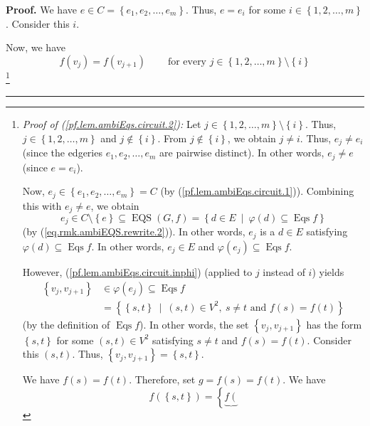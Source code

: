 \documentclass[numbers=enddot,12pt,final,onecolumn,notitlepage]{scrartcl}%
\theoremstyle{definition}
\newenvironment{proof}[1][Proof]{\noindent\textbf{#1.} }{\ \rule{0.5em}{0.5em}}
\newenvironment{verlong}{}{}
\begin{document}
\begin{verlong}
\begin{proof}
We have $e\in C=\left\{  e_{1},e_{2},\ldots,e_{m}\right\}  $. Thus, $e=e_{i}$
for some $i\in\left\{  1,2,\ldots,m\right\}  $. Consider this $i$.

Now, we have%
\begin{equation}
f\left(  v_{j}\right)  =f\left(  v_{j+1}\right)  \ \ \ \ \ \ \ \ \ \ \text{for
every }j\in\left\{  1,2,\ldots,m\right\}  \setminus\left\{  i\right\}
\label{pf.lem.ambiEqs.circuit.2}%
\end{equation}
\footnote{\textit{Proof of (\ref{pf.lem.ambiEqs.circuit.2}):} Let
$j\in\left\{  1,2,\ldots,m\right\}  \setminus\left\{  i\right\}  $. Thus,
$j\in\left\{  1,2,\ldots,m\right\}  $ and $j\notin\left\{  i\right\}  $. From
$j\notin\left\{  i\right\}  $, we obtain $j\neq i$. Thus, $e_{j}\neq e_{i}$
(since the edgeries $e_{1},e_{2},\ldots,e_{m}$ are pairwise distinct). In
other words, $e_{j}\neq e$ (since $e=e_{i}$).
\par
Now, $e_{j}\in\left\{  e_{1},e_{2},\ldots,e_{m}\right\}  =C$ (by
(\ref{pf.lem.ambiEqs.circuit.1})). Combining this with $e_{j}\neq e$, we
obtain
\[
e_{j}\in C\setminus\left\{  e\right\}  \subseteq\operatorname*{EQS}\left(
G,f\right)  =\left\{  d\in E\ \mid\ \varphi\left(  d\right)  \subseteq
\operatorname*{Eqs}f\right\}
\]
(by (\ref{eq.rmk.ambiEQS.rewrite.2})). In other words, $e_{j}$ is a $d\in E$
satisfying $\varphi\left(  d\right)  \subseteq\operatorname*{Eqs}f$. In other
words, $e_{j}\in E$ and $\varphi\left(  e_{j}\right)  \subseteq
\operatorname*{Eqs}f$.
\par
However, (\ref{pf.lem.ambiEqs.circuit.inphi}) (applied to $j$ instead of $i$)
yields
\begin{align*}
\left\{  v_{j},v_{j+1}\right\}   &  \in\varphi\left(  e_{j}\right)
\subseteq\operatorname*{Eqs}f\\
&  =\left\{  \left\{  s,t\right\}  \ \mid\ \left(  s,t\right)  \in
V^{2},\ s\neq t\text{ and }f\left(  s\right)  =f\left(  t\right)  \right\}
\end{align*}
(by the definition of $\operatorname*{Eqs}f$). In other words, the set
$\left\{  v_{j},v_{j+1}\right\}  $ has the form $\left\{  s,t\right\}  $ for
some $\left(  s,t\right)  \in V^{2}$ satisfying $s\neq t$ and $f\left(
s\right)  =f\left(  t\right)  $. Consider this $\left(  s,t\right)  $. Thus,
$\left\{  v_{j},v_{j+1}\right\}  =\left\{  s,t\right\}  $.
\par
We have $f\left(  s\right)  =f\left(  t\right)  $. Therefore, set $g=f\left(
s\right)  =f\left(  t\right)  $. We have%
\[
f\left(  \left\{  s,t\right\}  \right)  =\left\{  \underbrace{f\left(
}\]}
\end{proof}
\end{verlong}
\end{document}
